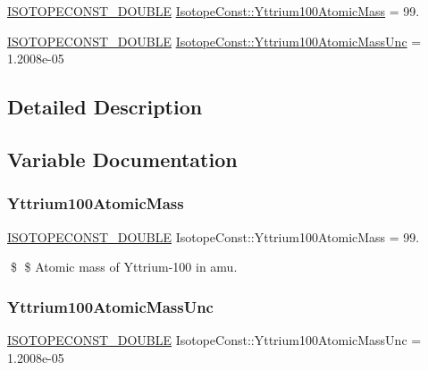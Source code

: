 \begin{DoxyCompactItemize}
\item 
\mbox{\hyperlink{group___isotope_const-_macros_ga8f45a7272ce02c0b4c65c44636ed719a}{I\+S\+O\+T\+O\+P\+E\+C\+O\+N\+S\+T\+\_\+\+D\+O\+U\+B\+LE}} \mbox{\hyperlink{group___isotope_const-_yttrium-_y100_ga8359906a88f65e6259d36b32c5fc4622}{Isotope\+Const\+::\+Yttrium100\+Atomic\+Mass}} = 99.
\item 
\mbox{\hyperlink{group___isotope_const-_macros_ga8f45a7272ce02c0b4c65c44636ed719a}{I\+S\+O\+T\+O\+P\+E\+C\+O\+N\+S\+T\+\_\+\+D\+O\+U\+B\+LE}} \mbox{\hyperlink{group___isotope_const-_yttrium-_y100_gad78edbc46ab424aea5342fffac3a6ccc}{Isotope\+Const\+::\+Yttrium100\+Atomic\+Mass\+Unc}} = 1.\+2008e-\/05
\end{DoxyCompactItemize}


\subsection{Detailed Description}


\subsection{Variable Documentation}
\mbox{\label{group___isotope_const-_yttrium-_y100_ga8359906a88f65e6259d36b32c5fc4622}} 
\subsubsection{\texorpdfstring{Yttrium100\+Atomic\+Mass}{Yttrium100AtomicMass}}
{\footnotesize\ttfamily \mbox{\hyperlink{group___isotope_const-_macros_ga8f45a7272ce02c0b4c65c44636ed719a}{I\+S\+O\+T\+O\+P\+E\+C\+O\+N\+S\+T\+\_\+\+D\+O\+U\+B\+LE}} Isotope\+Const\+::\+Yttrium100\+Atomic\+Mass = 99.}

\$ \$ Atomic mass of Yttrium-\/100 in amu. \mbox{\label{group___isotope_const-_yttrium-_y100_gad78edbc46ab424aea5342fffac3a6ccc}} 
\subsubsection{\texorpdfstring{Yttrium100\+Atomic\+Mass\+Unc}{Yttrium100AtomicMassUnc}}
{\footnotesize\ttfamily \mbox{\hyperlink{group___isotope_const-_macros_ga8f45a7272ce02c0b4c65c44636ed719a}{I\+S\+O\+T\+O\+P\+E\+C\+O\+N\+S\+T\+\_\+\+D\+O\+U\+B\+LE}} Isotope\+Const\+::\+Yttrium100\+Atomic\+Mass\+Unc = 1.\+2008e-\/05}


